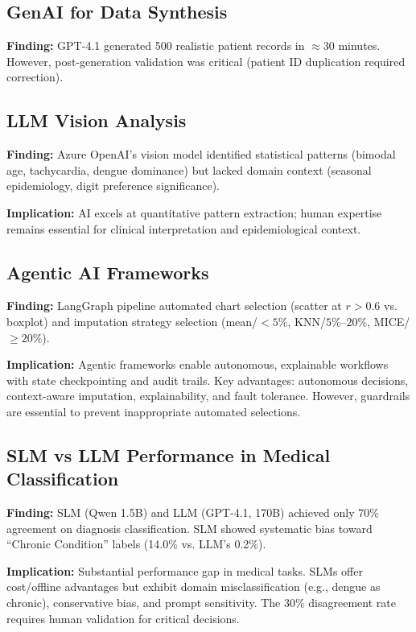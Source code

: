 \documentclass[10pt,a4paper]{article}
\begin{document}
\subsection{GenAI for Data Synthesis}

\textbf{Finding:} GPT-4.1 generated 500 realistic patient records in $\approx$30 minutes. However, post-generation validation was critical (patient ID duplication required correction).

\subsection{LLM Vision Analysis}

\textbf{Finding:} Azure OpenAI's vision model identified statistical patterns (bimodal age, tachycardia, dengue dominance) but lacked domain context (seasonal epidemiology, digit preference significance).

\textbf{Implication:} AI excels at quantitative pattern extraction; human expertise remains essential for clinical interpretation and epidemiological context.

\subsection{Agentic AI Frameworks}

\textbf{Finding:} LangGraph pipeline automated chart selection (scatter at $r>0.6$ vs. boxplot) and imputation strategy selection (mean/$<5\%$, KNN/$5\%$--$20\%$, MICE/$\geq 20\%$).

\textbf{Implication:} Agentic frameworks enable autonomous, explainable workflows with state checkpointing and audit trails. Key advantages: autonomous decisions, context-aware imputation, explainability, and fault tolerance. However, guardrails are essential to prevent inappropriate automated selections.

\subsection{SLM vs LLM Performance in Medical Classification}

\textbf{Finding:} SLM (Qwen 1.5B) and LLM (GPT-4.1, 170B) achieved only 70\% agreement on diagnosis classification. SLM showed systematic bias toward ``Chronic Condition'' labels (14.0\% vs. LLM's 0.2\%).

\textbf{Implication:} Substantial performance gap in medical tasks. SLMs offer cost/offline advantages but exhibit domain misclassification (e.g., dengue as chronic), conservative bias, and prompt sensitivity. The 30\% disagreement rate requires human validation for critical decisions.
\end{document}
